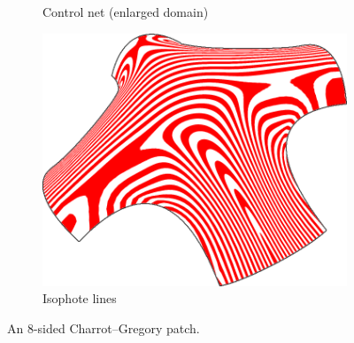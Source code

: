 \documentclass[9pt,academicons]{article}
\begin{document}
\begin{figure}
\begin{subfigure}{.3\textwidth}
    \caption{Control net (enlarged domain)}
    \label{fig:8sided-enlarged}
  \end{subfigure}
  \hfill
  \begin{subfigure}{.3\textwidth}
    \centering
    \includegraphics[width=.883\textwidth]{images/8sided-3.png}
    \caption{Isophote lines}
    \label{fig:8sided-iso}
  \end{subfigure}
  \caption{An 8-sided Charrot--Gregory patch.}
  \label{fig:8sided}
\end{figure}
\end{document}
